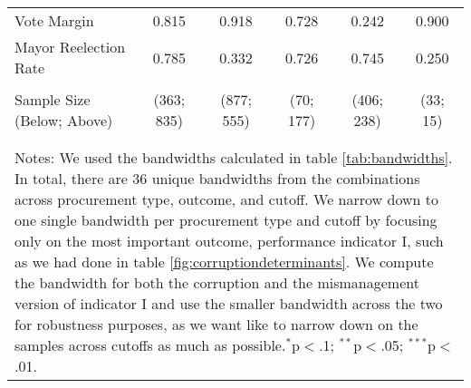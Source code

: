 \documentclass[border = 1pt$]{standalone}
\begin{document}
\begin{tabular}{@{\extracolsep{6pt}}lccccc}
Vote Margin                   & 0.815         & 0.918         & 0.728         & 0.242       & 0.900 \\[1.0ex]
Mayor Reelection Rate         & 0.785         & 0.332         & 0.726         & 0.745       & 0.250 \\[1.0ex]
\hline \\[-1.8ex]
Sample Size (Below; Above)    & (363; 835) & (877; 555) & (70; 177) & (406; 238) & (33; 15) \\
\\[-1.8ex]\hline
\hline \\[-1.8ex]
\multicolumn{6}{p{.68\textwidth}}{Notes: We used the \citet{CalonicoOptimalDataDrivenRegression2015} bandwidths calculated in table \ref{tab:bandwidths}. In total, there are 36 unique bandwidths from the combinations across procurement type, outcome, and cutoff. We narrow down to one single bandwidth per procurement type and cutoff by focusing only on the most important outcome, performance indicator I, such as we had done in table \ref{fig:corruptiondeterminants}. We compute the bandwidth for both the corruption and the mismanagement version of indicator I and use the smaller bandwidth across the two for robustness purposes, as we want like to narrow down on the samples across cutoffs as much as possible.$^{*}$p$<$.1; $^{**}$p$<$.05; $^{***}$p$<$.01.}
\end{tabular}
\end{document}
